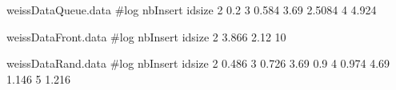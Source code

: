 
\begin{filecontents}{weissDataQueue.data}
#log nbInsert idsize  
2 0.2
3 0.584
3.69 2.5084
4 4.924

\end{filecontents}

\begin{filecontents}{weissDataFront.data}
#log nbInsert  idsize  
2 3.866
2.12 10
\end{filecontents}

\begin{filecontents}{weissDataRand.data}
#log nbInsert  idsize  
2 0.486
3 0.726
3.69 0.9
4 0.974
4.69 1.146
5 1.216
\end{filecontents}

